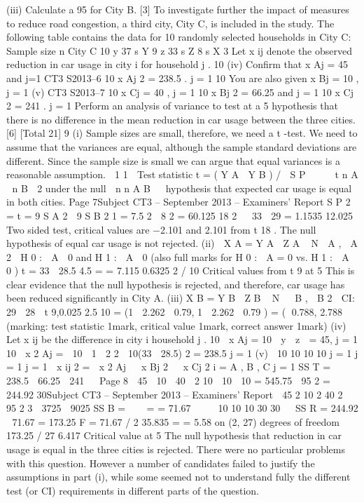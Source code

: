 (iii) Calculate a 95%
for City B.
[3]
To investigate further the impact of measures to reduce road congestion, a third city,
City C, is included in the study. The following table contains the data for 10 randomly
selected households in City C:
Sample size n
City C
10
y
37
s Y
9
z
33
s Z
8
s X
3
Let x ij denote the observed reduction in car usage in city i for household j .
10
(iv)
Confirm that
\sum  x Aj = 45 and
j=1
CT3 S2013–6
10
\sum  x Aj 2 = 238.5 .
j = 1
10
You are also given
\sum  x Bj = 10 ,
j = 1
(v)
CT3 S2013–7
10
\sum  x Cj = 40 ,
j = 1
10
\sum  x Bj 2 = 66.25 and
j = 1
10
\sum  x Cj 2 = 241 .
j = 1
Perform an analysis of variance to test at a 5%
hypothesis that there is no difference in the mean reduction in car usage
between the three cities.
[6]
[Total 21]
9
(i)
Sample sizes are small, therefore, we need a t -test. We need to assume that
the variances are equal, although the sample standard deviations are different.
Since the sample size is small we can argue that equal variances is a
reasonable assumption.

1
1 
Test statistic t  =  ( Y A  Y B ) /  S P

  ~ t n A  n B  2 under the null

n
n
A
B 

hypothesis that expected car usage is equal in both cities.
Page 7Subject CT3 – September 2013 – Examiners’ Report
S P 2  = 
t  = 
9 S A 2  9 S B 2 1
 =  7.5 2  8 2  =  60.125
18
2


33  29
 =  1.1535
12.025
Two sided test, critical values are −2.101 and 2.101 from t 18 .
The null hypothesis of equal car usage is not rejected.
(ii)

X A  =  Y A  Z A ~ N  A ,  A 2

H 0 :  A  0 and H 1 :  A  0 (also full marks for H 0 :  A  =  0 vs. H 1 :  A  0 )
t  = 
33  28.5
4.5
 = 
 =  7.115
0.6325
2 / 10
Critical values from t 9 at 5%
This is clear evidence that the null hypothesis is rejected, and therefore, car
usage has been reduced significantly in City A.
(iii)
X B  =  Y B  Z B ~ N   B ,  B 2 
CI: 29  28 
t 9,0.025 2.5
10
 =  (1  2.262  0.79, 1  2.262  0.79 )  =  ( 0.788, 2.788 
(marking: test statistic 1mark, critical value 1mark, correct answer 1mark)
(iv)
Let x ij be the difference in city i household j .
10
 x Aj  =  10  y  z   =  45,
j  =  1
10
 x 2 Aj  =   10  1  2 2  10(33  28.5) 2  =  238.5
j  =  1
(v)

10
10 10 10
j  =  1 j  =  1 j  =  1
 x ij 2  =   x 2 Aj   x Bj 2   x Cj 2
i  =  A , B , C j  =  1
SS T  =   238.5  66.25  241  
Page 8
 45  10  40  2
10  10  10
 =  545.75 
95 2
 =  244.92
30Subject CT3 – September 2013 – Examiners’ Report
 45 2 10 2 40 2  95 2 3  3725  9025
SS B  =  


 = 
 =  71.67
  
 10 10
10
30
30


SS R  =  244.92  71.67  =  173.25
F  = 
71.67 / 2
35.835
 = 
 =  5.58 on (2, 27) degrees of freedom
173.25 / 27 6.417
Critical value at 5%
The null hypothesis that reduction in car usage is equal in the three cities is
rejected.
There were no particular problems with this question. However a number of candidates
failed to justify the assumptions in part (i), while some seemed not to understand fully the
different test (or CI) requirements in different parts of the question.
